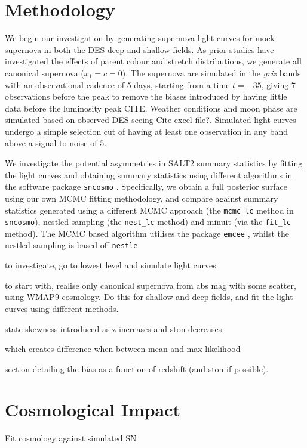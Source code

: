 \documentclass[a4paper,fleqn,usenatbib]{mnras}
\newcommand{\blue}{\color{blue}}
\newcommand{\red}{\color{red}}
\begin{document}
\section{Methodology}
\label{sec:methodology}

We begin our investigation by generating supernova light curves for mock supernova in both the DES deep and shallow fields. As prior studies have investigated the effects of parent colour and stretch distributions, we generate all canonical supernova ($x_1 = c = 0$). The supernova are simulated in the \textit{griz} bands with an observational cadence of 5 days, starting from a time $t = -35$, giving 7 observations before the peak to remove the biases introduced by having little data before the luminosity peak {\red CITE}. Weather conditions and moon phase are simulated based on observed DES seeing {\red Cite excel file?}. Simulated light curves undergo a simple selection cut of having at least one observation in any band above a signal to noise of $5$.

We investigate the potential asymmetries in SALT2 summary statistics by fitting the light curves and obtaining summary statistics using different algorithms in the software package \verb|sncosmo| \citep{Barbary2014}. Specifically, we obtain a full posterior surface using our own MCMC fitting methodology, and compare against summary statistics generated using a different MCMC approach (the \verb|mcmc_lc| method in \verb|sncosmo|), nestled sampling (the \verb|nest_lc| method) and minuit (via the \verb|fit_lc| method). The MCMC based algorithm utilises the package \verb|emcee| \citep{ForemanMackey2013}, whilst the nestled sampling is based off \verb|nestle| \citep{Skilling2004, Barbary2015}






{\blue
to investigate, go to lowest level and simulate light curves

to start with, realise only canonical supernova from abs mag with some scatter, using WMAP9 cosmology. Do this for shallow and deep fields, and fit the light curves using different methods.

state skewness introduced as z increases and ston decreases

which creates difference when between mean and max likelihood

section detailing the bias as a function of redshift (and ston if possible). }

\section{Cosmological Impact}
\label{sec:cosmology}
Fit cosmology against simulated SN
\end{document}
